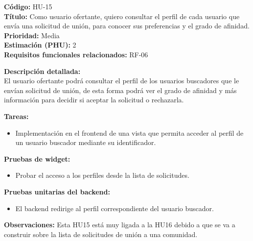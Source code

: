 \begin{tarjetaHU}
\textbf{Código:} HU-15 \\
\textbf{Título:} Como usuario ofertante, quiero consultar el perfil de cada usuario que envía una solicitud de unión, para conocer sus preferencias y el grado de afinidad. \\
\textbf{Prioridad:} Media \\
\textbf{Estimación (PHU):} 2 \\
\textbf{Requisitos funcionales relacionados:} RF-06

\vspace{0.5em}
\textbf{Descripción detallada:} \\
El usuario ofertante podrá consultar el perfil de los usuarios buscadores que le envían solicitud de unión, de esta forma podrá ver el grado de afinidad y más información para decidir si aceptar la solicitud o rechazarla.

\vspace{0.5em}
\textbf{Tareas:}
\begin{itemize}[left=0pt]
  \item Implementación en el frontend de una vista que permita acceder al perfil de un usuario buscador mediante su identificador.
\end{itemize}

\vspace{0.5em}
\textbf{Pruebas de widget:}
\begin{itemize}[left=0pt]
    \item Probar el acceso a los perfiles desde la lista de solicitudes.
\end{itemize}
\textbf{Pruebas unitarias del backend:}
\begin{itemize}[left=0pt]
  \item El backend redirige al perfil correspondiente del usuario buscador.

\end{itemize}
\textbf{Observaciones:}
Esta HU15 está muy ligada a la HU16 debido a que se va a construir sobre la lista de solicitudes de unión a una comunidad.
\end{tarjetaHU}

